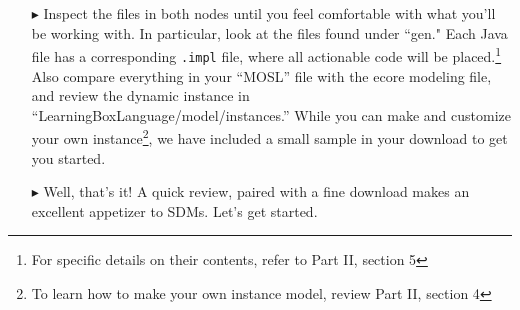 \begin{itemize}

\item[$\blacktriangleright$] Inspect the files in both nodes until you feel comfortable with what you'll be working with. In particular, look at the
files found under ``gen." Each Java file has a corresponding \texttt{.impl} file, where all actionable code will be placed.\footnote{For specific details on
their contents, refer to Part II, section 5} Also compare everything in your ``MOSL'' file with the ecore modeling file, and review the dynamic instance in
``LearningBoxLanguage/model/instances.'' While you can make and customize your own instance\footnote{To learn how to make your own instance model, review Part
II, section 4}, we have included a small sample in your download to get you started.

\item[$\blacktriangleright$] Well, that's it! A quick review, paired with a fine download makes an excellent appetizer to SDMs. Let's get started.

\end{itemize}

